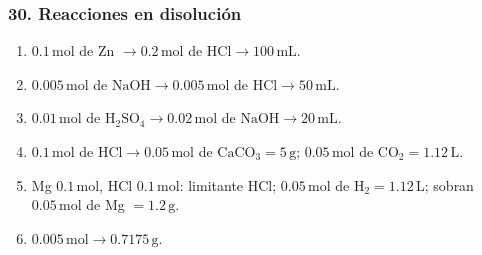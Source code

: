 \subsubsection*{30. Reacciones en disolución}
\begin{enumerate}
    \item[a)] $0.1\,\mathrm{mol}$ de Zn $\rightarrow
    0.2\,\mathrm{mol}$ de $\mathrm{HCl}\rightarrow100\,\mathrm{mL}$.

    \item[b)] $0.005\,\mathrm{mol}$ de $\mathrm{NaOH}\rightarrow
    0.005\,\mathrm{mol}$ de $\mathrm{HCl}\rightarrow50\,\mathrm{mL}$.

    \item[c)] $0.01\,\mathrm{mol}$ de $\mathrm{H_2SO_4}\rightarrow
    0.02\,\mathrm{mol}$ de $\mathrm{NaOH}\rightarrow20\,\mathrm{mL}$.

    \item[d)] $0.1\,\mathrm{mol}$ de $\mathrm{HCl}\rightarrow
    0.05\,\mathrm{mol}$ de $\mathrm{CaCO_3}=5\,\mathrm{g}$;
    $0.05\,\mathrm{mol}$ de $\mathrm{CO_2}=1.12\,\mathrm{L}$.

    \item[e)] Mg $0.1\,\mathrm{mol}$,
    $\mathrm{HCl}$ $0.1\,\mathrm{mol}$:
    limitante $\mathrm{HCl}$;
    $0.05\,\mathrm{mol}$ de $\mathrm{H_2}=1.12\,\mathrm{L}$;
    sobran $0.05\,\mathrm{mol}$ de Mg $=1.2\,\mathrm{g}$.

    \item[f)] $0.005\,\mathrm{mol}\rightarrow0.7175\,\mathrm{g}$.
\end{enumerate}